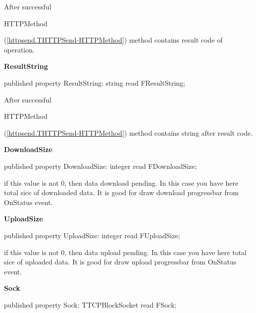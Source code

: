 \documentclass{report}
\newif\ifpdf
\begin{document}
\begin{list}{}
\begin{flushleft}
\ifpdf
\end{flushleft}
\fi


\par After successful \begin{ttfamily}HTTPMethod\end{ttfamily}(\ref{httpsend.THTTPSend-HTTPMethod}) method contains result code of operation.\label{httpsend.THTTPSend-ResultString}
\item[\textbf{ResultString}\hfill]
\ifpdf
\begin{flushleft}
\fi
\begin{ttfamily}
published property ResultString: string read FResultString;\end{ttfamily}

\ifpdf
\end{flushleft}
\fi


\par After successful \begin{ttfamily}HTTPMethod\end{ttfamily}(\ref{httpsend.THTTPSend-HTTPMethod}) method contains string after result code.\label{httpsend.THTTPSend-DownloadSize}
\item[\textbf{DownloadSize}\hfill]
\ifpdf
\begin{flushleft}
\fi
\begin{ttfamily}
published property DownloadSize: integer read FDownloadSize;\end{ttfamily}

\ifpdf
\end{flushleft}
\fi


\par if this value is not 0, then data download pending. In this case you have here total sice of downloaded data. It is good for draw download progressbar from OnStatus event.\label{httpsend.THTTPSend-UploadSize}
\item[\textbf{UploadSize}\hfill]
\ifpdf
\begin{flushleft}
\fi
\begin{ttfamily}
published property UploadSize: integer read FUploadSize;\end{ttfamily}

\ifpdf
\end{flushleft}
\fi


\par if this value is not 0, then data upload pending. In this case you have here total sice of uploaded data. It is good for draw upload progressbar from OnStatus event.\label{httpsend.THTTPSend-Sock}
\item[\textbf{Sock}\hfill]
\ifpdf
\begin{flushleft}
\fi
\begin{ttfamily}
published property Sock: TTCPBlockSocket read FSock;\end{ttfamily}


\end{flushleft}
\end{list}
\end{document}
